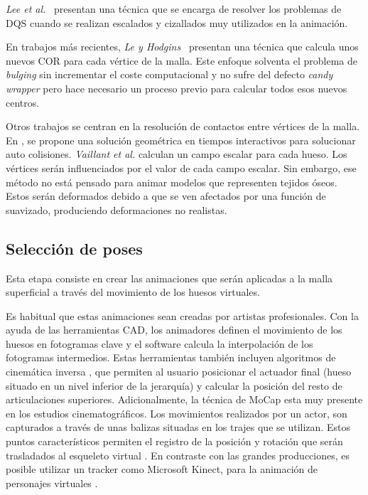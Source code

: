 \emph{Lee et al.}~\cite{Lee2013} presentan una técnica que se encarga de resolver los problemas de \ac{DQS} cuando se realizan escalados y cizallados muy utilizados en la animación.

En trabajos más recientes, \emph{Le y Hodgins}~\cite{le2016real} presentan una técnica que calcula unos nuevos \ac{COR} para cada vértice de la malla. Este enfoque solventa el problema de \emph{bulging} sin incrementar el coste computacional y no sufre del defecto \emph{candy wrapper} pero hace necesario un proceso previo para calcular todos esos nuevos centros.


%
%
Otros trabajos se centran en la resolución de contactos entre vértices de la malla. En \cite{Vaillant:2014}, se propone una solución geométrica  en tiempos interactivos para solucionar auto colisiones. \emph{Vaillant et al.} calculan un campo escalar para cada hueso. Los vértices serán influenciados por el valor de cada campo escalar. Sin embargo, ese método no está pensado para animar modelos que representen tejidos óseos. Estos serán deformados debido a que se ven afectados por una función de suavizado, produciendo deformaciones no realistas. %



\subsection{Selección de poses} 

Esta etapa consiste en crear las animaciones que serán aplicadas a la malla superficial a través del movimiento de los huesos virtuales.   

Es habitual que estas animaciones sean creadas por artistas profesionales. Con la ayuda de las herramientas \ac{CAD}, los animadores definen el movimiento de los huesos en fotogramas clave y el software calcula la interpolación de los fotogramas intermedios. Estas herramientas también incluyen algoritmos de cinemática inversa \cite{Shi:2007}, que permiten al usuario posicionar el actuador final (hueso situado en un nivel inferior de la jerarquía) y calcular la posición del resto de articulaciones superiores. 
Adicionalmente, la técnica de \ac{MoCap} esta muy presente en los estudios cinematográficos. Los movimientos realizados por un actor, son capturados a través de unas balizas situadas en los trajes que se utilizan. Estos puntos característicos permiten el registro de la posición y rotación que serán trasladados al esqueleto virtual \cite{Menache:1999}. En contraste con las grandes producciones, es posible utilizar un \ac{tracker} como Microsoft Kinect, para la animación de personajes virtuales \cite{Liu:2018}.



